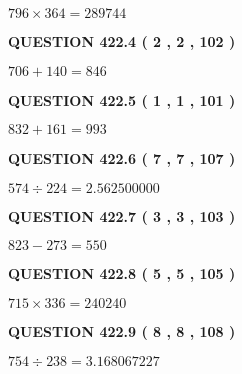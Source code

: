 \documentclass{ctexart}
\begin{document}
 

$ %
796 \times  %
364=   %
289744$
 
 
  
\vspace{0.2in}
  
{\textbf{\Large{QUESTION
422.4 
 ( 2 , 2 , 102 )
}}}
  
  
 
 

$ %
706 +  %
140=   %
846$
 
 
  
\vspace{0.2in}
  
{\textbf{\Large{QUESTION
422.5 
 ( 1 , 1 , 101 )
}}}
  
  
 
 

$ %
832 +  %
161=   %
993$
 
 
  
\vspace{0.2in}
  
{\textbf{\Large{QUESTION
422.6 
 ( 7 , 7 , 107 )
}}}
  
  
 
 

$ %
574 \div  %
224=   %
2.562500000$
 
 
  
\vspace{0.2in}
  
{\textbf{\Large{QUESTION
422.7 
 ( 3 , 3 , 103 )
}}}
  
  
 
 

$ %
823 -  %
273=   %
550$
 
 
  
\vspace{0.2in}
  
{\textbf{\Large{QUESTION
422.8 
 ( 5 , 5 , 105 )
}}}
  
  
 
 

$ %
715 \times  %
336=   %
240240$
 
 
  
\vspace{0.2in}
  
{\textbf{\Large{QUESTION
422.9 
 ( 8 , 8 , 108 )
}}}
  
  
 
 

$ %
754 \div  %
238=   %
3.168067227$
 
 
  
\vspace{0.2in}
  
\end{document}
